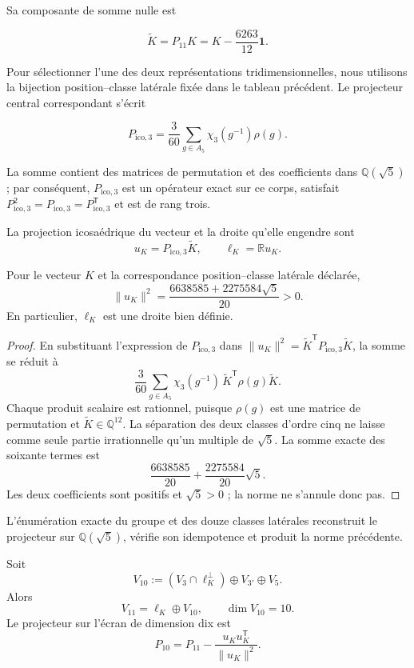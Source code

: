 Sa composante de somme nulle est

\[
\widetilde K=P_{11}K
=K-\frac{6263}{12}\mathbf1.
\]

Pour sélectionner l'une des deux représentations tridimensionnelles, nous utilisons la
bijection position--classe latérale fixée dans le tableau précédent. Le projecteur central
correspondant s'écrit

\[
P_{\mathrm{ico},3}=\frac{3}{60}\sum_{g\in A_5}\chi_3(g^{-1})\rho(g).
\]

La somme contient des matrices de permutation et des coefficients dans
\(\mathbb Q(\sqrt5)\) ; par conséquent, \(P_{\mathrm{ico},3}\) est un opérateur exact sur
ce corps, satisfait \(P_{\mathrm{ico},3}^2=P_{\mathrm{ico},3}=P_{\mathrm{ico},3}^{\mathsf T}\) et est de rang trois.

\begin{definition}
La projection icosaédrique du vecteur et la droite qu'elle engendre sont
\[
u_K=P_{\mathrm{ico},3}\widetilde K,
\qquad
\ell_K=\mathbb R u_K.
\]
\end{definition}

\begin{lemma}
\label{lem:norma-uk}
Pour le vecteur \(K\) et la correspondance position--classe latérale déclarée,
\[
\|u_K\|^2
=\frac{6638585+2275584\sqrt5}{20}>0.
\]
En particulier, \(\ell_K\) est une droite bien définie.
\end{lemma}

\begin{proof}
En substituant l'expression de \(P_{\mathrm{ico},3}\) dans
\(\|u_K\|^2=\widetilde K^{\mathsf T}P_{\mathrm{ico},3}\widetilde K\), la somme se réduit à
\[
\frac3{60}\sum_{g\in A_5}
\chi_3(g^{-1})\,
\widetilde K^{\mathsf T}\rho(g)\widetilde K.
\]
Chaque produit scalaire est rationnel, puisque \(\rho(g)\) est une matrice de
permutation et \(\widetilde K\in\mathbb Q^{12}\). La séparation des deux
classes d'ordre cinq ne laisse comme seule partie irrationnelle qu'un multiple de
\(\sqrt5\). La somme exacte des soixante termes est
\[
\frac{6638585}{20}+\frac{2275584}{20}\sqrt5.
\]
Les deux coefficients sont positifs et \(\sqrt5>0\) ; la norme ne
s'annule donc pas.
\end{proof}

L'énumération exacte du groupe et des douze classes latérales reconstruit le
projecteur sur \(\mathbb Q(\sqrt5)\), vérifie son idempotence et produit la
norme précédente.

\begin{theorem}
\label{thm:once-diez}
Soit
\[
V_{10}:=(V_3\cap\ell_K^\perp)\oplus V_{3'}\oplus V_5.
\]
Alors
\[
V_{11}=\ell_K\oplus V_{10},
\qquad
\dim V_{10}=10.
\]
Le projecteur sur l'écran de dimension dix est
\[
P_{10}=P_{11}-\frac{u_Ku_K^{\mathsf T}}{\|u_K\|^2}.
\]
\end{theorem}

